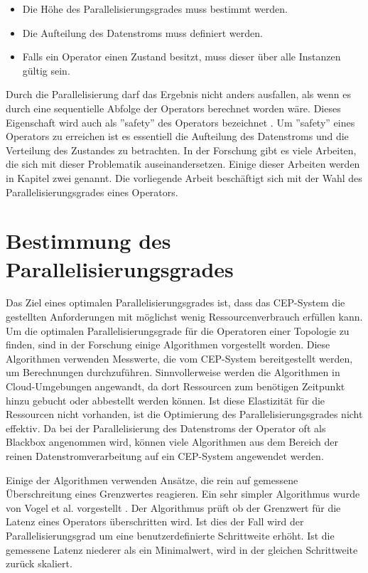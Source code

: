 \begin{itemize}
\item{Die Höhe des Parallelisierungsgrades muss bestimmt werden.}
\item{Die Aufteilung des Datenstroms muss definiert werden.}
\item{Falls ein Operator einen Zustand besitzt, muss dieser über alle Instanzen gültig sein.}
\end{itemize}

Durch die Parallelisierung darf das Ergebnis nicht anders ausfallen, als wenn es durch eine sequentielle Abfolge der Operators berechnet worden wäre.
Dieses Eigenschaft wird auch als ''safety'' des Operators bezeichnet \cite{gedik_elastic_2014}.
Um ''safety'' eines Operators zu erreichen ist es essentiell die Aufteilung des Datenstroms und die Verteilung des Zustandes zu betrachten.
In der Forschung gibt es viele Arbeiten, die sich mit dieser Problematik auseinandersetzen.
Einige dieser Arbeiten werden in Kapitel zwei genannt.
Die vorliegende Arbeit beschäftigt sich mit der Wahl des Parallelisierungsgrades eines Operators.

\section{Bestimmung des Parallelisierungsgrades}

Das Ziel eines optimalen Parallelisierungsgrades ist, dass das CEP-System die gestellten Anforderungen mit möglichst wenig Ressourcenverbrauch erfüllen kann.
Um die optimalen Parallelisierungsgrade für die Operatoren einer Topologie zu finden, sind in der Forschung einige Algorithmen vorgestellt worden.
Diese Algorithmen verwenden Messwerte, die vom CEP-System bereitgestellt werden, um Berechnungen durchzuführen.
Sinnvollerweise werden die Algorithmen in Cloud-Umgebungen angewandt, da dort Ressourcen zum benötigen Zeitpunkt hinzu gebucht oder abbestellt werden können.
Ist diese Elastizität für die Ressourcen nicht vorhanden, ist die Optimierung des Parallelisierungsgrades nicht effektiv.
Da bei der Parallelisierung des Datenstroms der Operator oft als Blackbox angenommen wird, können viele Algorithmen aus dem Bereich der reinen Datenstromverarbeitung auf ein CEP-System angewendet werden.

Einige der Algorithmen verwenden Ansätze, die rein auf gemessene Überschreitung eines Grenzwertes reagieren.
Ein sehr simpler Algorithmus wurde von Vogel et al. vorgestellt \cite{vogel_autonomic_nodate}.
Der Algorithmus prüft ob der Grenzwert für die Latenz eines Operators überschritten wird.
Ist dies der Fall wird der Parallelisierungsgrad um eine benutzerdefinierte Schrittweite erhöht.
Ist die gemessene Latenz niederer als ein Minimalwert, wird in der gleichen Schrittweite zurück skaliert.

